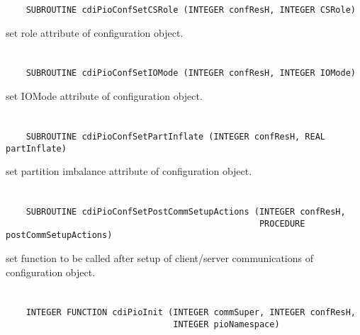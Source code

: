 \begin{verbatim}
    SUBROUTINE cdiPioConfSetCSRole (INTEGER confResH, INTEGER CSRole)
\end{verbatim}

set role attribute of configuration object.


\section*{\tt {}}

\begin{verbatim}
    SUBROUTINE cdiPioConfSetIOMode (INTEGER confResH, INTEGER IOMode)
\end{verbatim}

set IOMode attribute of configuration object.


\section*{\tt {}}

\begin{verbatim}
    SUBROUTINE cdiPioConfSetPartInflate (INTEGER confResH, REAL partInflate)
\end{verbatim}

set partition imbalance attribute of
configuration object.


\section*{\tt {}}

\begin{verbatim}
    SUBROUTINE cdiPioConfSetPostCommSetupActions (INTEGER confResH,
                                                  PROCEDURE postCommSetupActions)
\end{verbatim}

set function to be called after
setup of client/server communications of configuration object.


\section*{\tt {}}

\begin{verbatim}
    INTEGER FUNCTION cdiPioInit (INTEGER commSuper, INTEGER confResH,
                                 INTEGER pioNamespace)
\end{verbatim}

